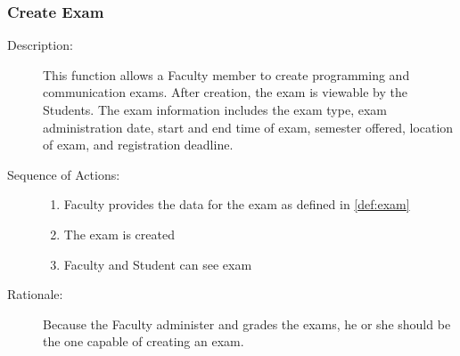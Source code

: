    \subsubsection{\large Create Exam} 
   \begin{boxed} %
      \begin{description}
         \item[Description:\label{desc:create_exam}]
      This function allows a Faculty member to create programming and
      communication exams. After creation, the exam is viewable by the Students.
      The exam information includes the exam type, exam administration date,
      start and end time of exam, semester offered, location of exam, and
      registration deadline.
      
         \item[Sequence of Actions:]\hspace{10cm}
      \begin{enumerate}
         \item Faculty provides the data for the exam as defined in
            \autoref{def:exam}
         \item The exam is created
         \item Faculty and Student can see exam
      \end{enumerate}

         \item[Rationale:]
      Because the Faculty administer and grades the exams, he or she should
      be the one capable of creating an exam.
      \end{description}
   \end{boxed} %

